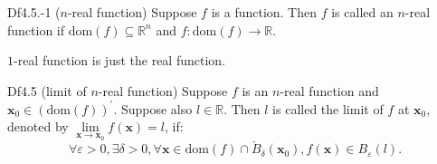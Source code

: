 \documentclass{article}
\begin{document}
\begin{Df}{Df4.5.-1 ($n$-real function)}
    Suppose $f$ is a function. Then $f$ is called an $n$-real function if $\text{dom}(f)\subseteq\mathbb{R}^n$ and $f: \text{dom}(f)\rightarrow\mathbb{R}$.
\end{Df}

\begin{Rmk}{}
    $1$-real function is just the real function.
\end{Rmk}

\begin{Df}{Df4.5 (limit of $n$-real function)}
    Suppose $f$ is an $n$-real function and $\pmb{x}_0\in(\text{dom}(f))^\prime$. Suppose also $l\in\mathbb{R}$. Then $l$ is called the limit of $f$ at $\pmb{x}_0$, denoted by $\lim\limits_{\pmb{x}\to\pmb{x}_0}f(\pmb{x}) = l$, if:
    $$ \forall\varepsilon>0, \exists\delta>0, \forall\pmb{x}\in\text{dom}(f)\cap \check{B}_\delta(\pmb{x}_0), f(\pmb{x})\in B_\varepsilon(l). $$
\end{Df}
\end{document}
